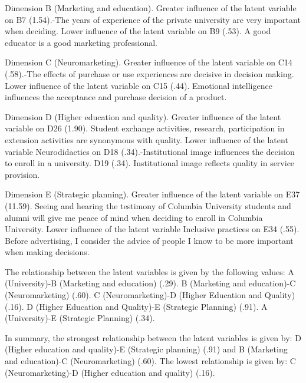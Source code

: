 \documentclass[english]{textolivre}
\begin{document}
Dimension B (Marketing and education). Greater influence of the latent variable on B7 (1.54).-The years of experience of the private university are very important when deciding. Lower influence of the latent variable on B9 (.53). A good educator is a good marketing professional.

Dimension C (Neuromarketing). Greater influence of the latent variable on C14 (.58).-The effects of purchase or use experiences are decisive in decision making. Lower influence of the latent variable on C15 (.44). Emotional intelligence influences the acceptance and purchase decision of a product.

Dimension D (Higher education and quality). Greater influence of the latent variable on D26 (1.90). Student exchange activities, research, participation in extension activities are synonymous with quality. Lower influence of the latent variable Neurodidactics on D18 (.34).-Institutional image influences the decision to enroll in a university. D19 (.34). Institutional image reflects quality in service provision.

Dimension E (Strategic planning). Greater influence of the latent variable on E37 (11.59). Seeing and hearing the testimony of Columbia University students and alumni will give me peace of mind when deciding to enroll in Columbia University. Lower influence of the latent variable Inclusive practices on E34 (.55). Before advertising, I consider the advice of people I know to be more important when making decisions.

The relationship between the latent variables is given by the following values: A (University)-B (Marketing and education) (.29). B (Marketing and education)-C (Neuromarketing) (.60). C (Neuromarketing)-D (Higher Education and Quality) (.16). D (Higher Education and Quality)-E (Strategic Planning) (.91). A (University)-E (Strategic Planning) (.34).

In summary, the strongest relationship between the latent variables is given by: D (Higher education and quality)-E (Strategic planning) (.91) and B (Marketing and education)-C (Neuromarketing) (.60). The lowest relationship is given by: C (Neuromarketing)-D (Higher education and quality) (.16).
\end{document}
